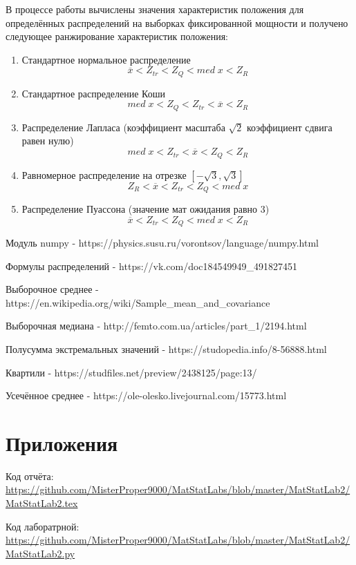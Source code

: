 \documentclass[a4]{article}
\begin{document}
\par В процессе работы вычислены значения характеристик положения для определённых распределений на выборках фиксированной мощности и получено следующее ранжирование характеристик положения:

\begin{enumerate}
    \item Стандартное нормальное распределение $$\overline{x} < Z_{tr} < Z_Q < med\;x < Z_R$$
    
    \item Стандартное распределение Коши $$med\;x < Z_Q < Z_{tr} < \overline{x} < Z_R$$
    
    \item Распределение Лапласа (коэффициент масштаба $\sqrt{2}$ коэффициент сдвига равен нулю) $$med\;x < Z_{tr} < \overline{x} < Z_Q < Z_R$$
    
    \item Равномерное распределение на отрезке $\left[-\sqrt{3},\sqrt{3}\right]$ $$Z_R < \overline{x} < Z_{tr} < Z_Q < med\;x$$
    
    \item Распределение Пуассона (значение мат ожидания равно $3$) $$\overline{x} < Z_{tr} < Z_Q < med\;x < Z_R$$
    
\end{enumerate}



\begin{thebibliography}{}
      Модуль numpy  -  https://physics.susu.ru/vorontsov/language/numpy.html
    
    Формулы распределений  -  https://vk.com/doc184549949\_491827451
    
    Выборочное среднее  -  https://en.wikipedia.org/wiki/Sample\_mean\_and\_covariance
    
    Выборочная медиана  -  http://femto.com.ua/articles/part\_1/2194.html
    
    Полусумма экстремальных значений  -  https://studopedia.info/8-56888.html
    
    Квартили  -  https://studfiles.net/preview/2438125/page:13/
    
      Усечённое среднее  -  https://ole-olesko.livejournal.com/15773.html
\end{thebibliography}

\section{Приложения}

 
Код отчёта:\; \url{https://github.com/MisterProper9000/MatStatLabs/blob/master/MatStatLab2/MatStatLab2.tex}

Код лаборатрной:\; \url{https://github.com/MisterProper9000/MatStatLabs/blob/master/MatStatLab2/MatStatLab2.py}


\end{document}
